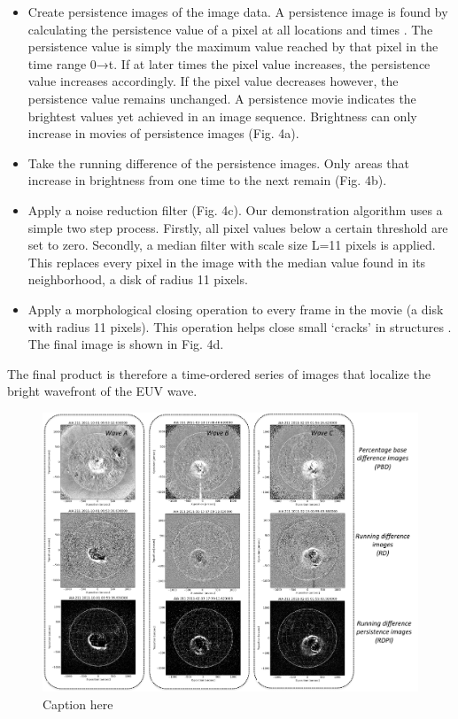 \begin{itemize}
\item Create persistence images of the image data.  A persistence image is found by calculating the persistence value of a pixel at all locations and times \citep[e.g.][]{2014AAS...22421838T}.  The persistence value is simply the maximum value reached by that pixel in the time range 0→t.  If at later times the pixel value increases, the persistence value increases accordingly. If the pixel value decreases however, the persistence value remains unchanged. A persistence movie indicates the brightest values yet achieved in an image sequence.  Brightness can only increase in movies of persistence images (Fig. 4a). 


\item Take the running difference of the persistence images. Only areas that increase in brightness from one time to the next remain (Fig. 4b).

\item Apply a noise reduction filter (Fig. 4c).  Our demonstration algorithm uses a simple two step process.  Firstly, all pixel values below a certain threshold are set to zero.  Secondly, a median filter with scale size L=11 pixels is applied.  This replaces every pixel in the image with the median value found in its neighborhood, a disk of radius 11 pixels.

\item Apply a morphological closing \citep{2002dip..book.....G} operation to every frame in the movie (a disk with radius 11 pixels).  This operation helps close small ‘cracks’ in structures \citep{2002dip..book.....G}.  The final image is shown in Fig. 4d.
\end{itemize}

The final product is therefore a time-ordered series of images that localize the bright wavefront of the EUV wave.

\begin{figure}
\begin{center}
\includegraphics[width=16cm]{aware_rdpm_figure_v3.pdf}
\caption{Caption here}
\end{center}
\end{figure}



